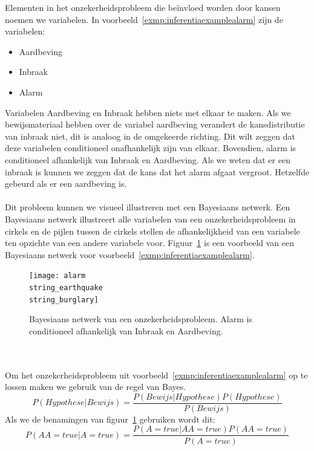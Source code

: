 \documentclass[12pt,a4paper,oneside]{book}
\theoremstyle{definition}
\begin{document}
Elementen in het onzekerheidsprobleem die be\"{i}nvloed worden door kansen noemen we variabelen. In voorbeeld~\ref{exmp:inferentiaexamplealarm} zijn de variabelen:
\begin{itemize}
	\item Aardbeving
	\item Inbraak
	\item Alarm
\end{itemize}
Variabelen Aardbeving en Inbraak hebben niets met elkaar te maken. Als we bewijsmateriaal hebben over de variabel aardbeving verandert de kansdistributie van inbraak niet, dit is analoog in de omgekeerde richting. Dit wilt zeggen dat deze variabelen conditioneel onafhankelijk zijn van elkaar. Bovendien, alarm is conditioneel afhankelijk van Inbraak en Aardbeving. Als we weten dat er een inbraak is kunnen we zeggen dat de kans dat het alarm afgaat vergroot. Hetzelfde gebeurd als er een aardbeving is.
\\\\
Dit probleem kunnen we visueel illustreren met een Bayesiaans netwerk. Een Bayesiaans netwerk illustreert alle variabelen van een onzekerheidsprobleem in cirkels en de pijlen tussen de cirkels stellen de afhankelijkheid van een variabele ten opzichte van een andere variabele voor. Figuur~\ref{figure:alarmearthquakeburglary} is een voorbeeld van een Bayesiaans netwerk voor voorbeeld~\ref{exmp:inferentiaexamplealarm}. 
\begin{figure}
	\centering
	\texttt{[image: alarm\\string\_earthquake\\string\_burglary]}
	\caption{Bayesiaans netwerk van een onzekerheidsprobleem. Alarm is conditioneel afhankelijk van Inbraak en Aardbeving.}
	\label{figure:alarmearthquakeburglary}
\end{figure}
\\\\
Om het onzekerheidsprobleem uit voorbeeld~\ref{exmp:inferentiaexamplealarm} op te lossen maken we gebruik van de regel van Bayes.
\begin{equation} 
	\label{eq:bayesrule}
	P(Hypothese|Bewijs) = \frac{P(Bewijs|Hypothese)P(Hypothese)}{P(Bewijs)}
\end{equation}
Als we de benamingen van figuur~\ref{figure:alarmearthquakeburglary} gebruiken wordt dit:
\begin{equation} 
	\label{eq:bayesruleforearthquakeburglary}
	P(AA=true|A=true) = \frac{P(A=true|AA=true)P(AA=true)}{P(A=true)}
\end{equation}
\end{document}
